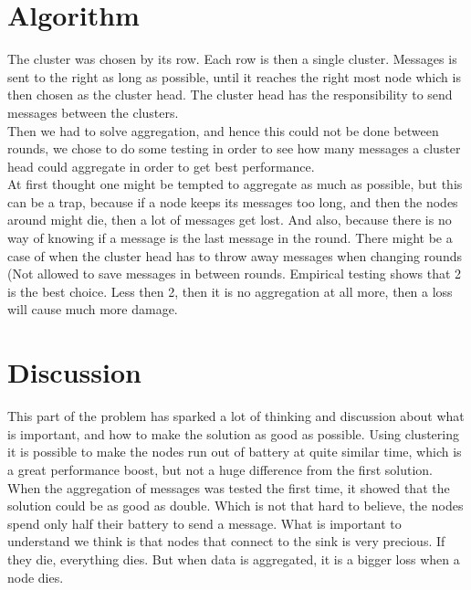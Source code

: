 \documentclass{article}
\begin{document}
  \section{Algorithm}
   The cluster was chosen by its row. Each row is then a single cluster. Messages
   is sent to the right as long as possible, until it reaches the right most
   node which is then chosen as the cluster head. The cluster head has the
   responsibility to send messages between the clusters.\\
   Then we had to solve aggregation, and hence this could not be done between
   rounds, we chose to do some testing in order to see how many messages a cluster
   head could aggregate in order to get best performance.\\
   At first thought one might be tempted to aggregate as much as possible, but
   this can be a trap, because if a node keeps its messages too long, and then
   the nodes around might die, then a lot of messages get lost. And also, because
   there is no way of knowing if a message is the last message in the round. There might be
   a case of when the cluster head has to throw away messages when changing
   rounds (Not allowed to save messages in between rounds. Empirical testing
   shows that 2 is the best choice. Less then 2, then it is no aggregation at all
   more, then a loss will cause much more damage. 
  \section{Discussion}
  This part of the problem has sparked a lot of thinking and discussion about what
  is important, and how to make the solution as good as possible. Using clustering 
  it is possible to make the nodes run out of battery at quite similar time, which
  is a great performance boost, but not a huge difference from the first solution.
  When the aggregation of messages was tested the first time, it showed that the
  solution could be as good as double. Which is not that hard to believe, the nodes
  spend only half their battery to send a message. What is important to understand
  we think is that nodes that connect to the sink is very precious. If they die, 
  everything dies. But when data is aggregated, it is a bigger loss when a node
  dies.
\end{document}
